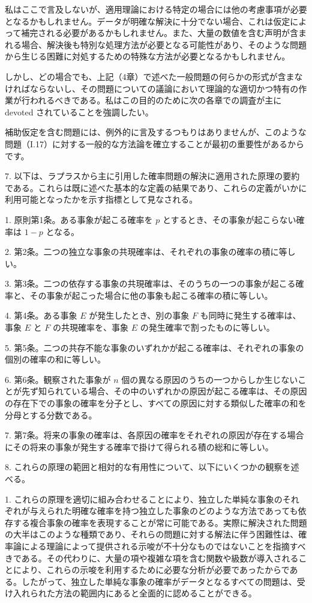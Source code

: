 \documentclass[a4paper,11pt,openany]{ltjsbook}
\begin{document}
私はここで言及しないが、適用理論における特定の場合には他の考慮事項が必要となるかもしれません。データが明確な解決に十分でない場合、これは仮定によって補完される必要があるかもしれません。また、大量の数値を含む声明が含まれる場合、解決後も特別な処理方法が必要となる可能性があり、そのような問題から生じる困難に対処するための特殊な方法が必要となるかもしれません。

しかし、どの場合でも、上記（4章）で述べた一般問題の何らかの形式が含まなければならないし、その問題についての議論において理論的な適切かつ特有の作業が行われるべきである。私はこの目的のために次の各章での調査が主に devoted されていることを強調したい。

補助仮定を含む問題には、例外的に言及するつもりはありませんが、このような問題（I.17）に対する一般的な方法論を確立することが最初の重要性があるからです。

7. 以下は、ラプラスから主に引用した確率問題の解決に適用された原理の要約である。これらは既に述べた基本的な定義の結果であり、これらの定義がいかに利用可能となったかを示す指標として見なされる。

1. 原則第1条。ある事象が起こる確率を \( p \) とするとき、その事象が起こらない確率は \( 1-p \) となる。

2. 第2条。二つの独立な事象の共現確率は、それぞれの事象の確率の積に等しい。

3. 第3条。二つの依存する事象の共現確率は、そのうちの一つの事象が起こる確率と、その事象が起こった場合に他の事象も起こる確率の積に等しい。

4. 第4条。ある事象 \( E \) が発生したとき、別の事象 \( F \) も同時に発生する確率は、事象 \( E \) と \( F \) の共現確率を、事象 \( E \) の発生確率で割ったものに等しい。

5. 第5条。二つの共存不能な事象のいずれかが起こる確率は、それぞれの事象の個別の確率の和に等しい。

6. 第6条。観察された事象が \( n \) 個の異なる原因のうちの一つからしか生じないことが先ず知られている場合、その中のいずれかの原因が起こる確率は、その原因の存在下での事象の確率を分子とし、すべての原因に対する類似した確率の和を分母とする分数である。

7. 第7条。将来の事象の確率は、各原因の確率をそれぞれの原因が存在する場合にその将来の事象が発生する確率で掛けて得られる積の総和に等しい。

8. これらの原理の範囲と相対的な有用性について、以下にいくつかの観察を述べる。

1. これらの原理を適切に組み合わせることにより、独立した単純な事象のそれぞれが与えられた明確な確率を持つ独立した事象のどのような方法であっても依存する複合事象の確率を表現することが常に可能である。実際に解決された問題の大半はこのような種類であり、それらの問題に対する解法に伴う困難性は、確率論による理論によって提供される示唆が不十分なものではないことを指摘すべきである。その代わりに、大量の項や複雑な項を含む関数や級数が導入されることにより、これらの示唆を利用するために必要な分析が必要であったからである。したがって、独立した単純な事象の確率がデータとなるすべての問題は、受け入れられた方法の範囲内にあると全面的に認めることができる。
\end{document}
